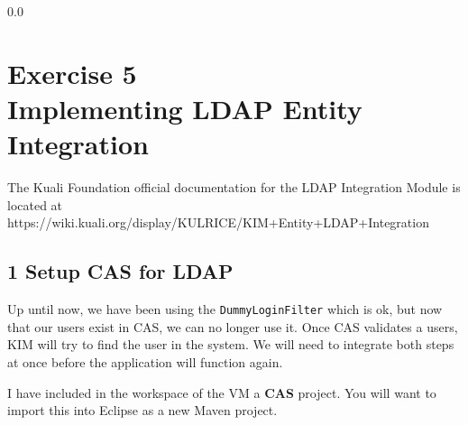 {\setlength{\baselineskip}%
  {0.0\baselineskip}
  \section*{\flushright Exercise 5\\
  Implementing LDAP Entity Integration}
  \hrulefill \par}

The Kuali Foundation official documentation for the LDAP Integration
Module is located at https://wiki.kuali.org/display/KULRICE/KIM+Entity+LDAP+Integration

\subsection*{1 Setup CAS for LDAP}
Up until now, we have been using the \verb|DummyLoginFilter| which is
ok, but now that our users exist in CAS, we can no longer use it. Once
CAS validates a users, KIM will try to find the user in the system. We
will need to integrate both steps at once before the application will
function again.

I have included in the workspace of the VM a \textbf{CAS} project. You
will want to import this into Eclipse as a new Maven project.

